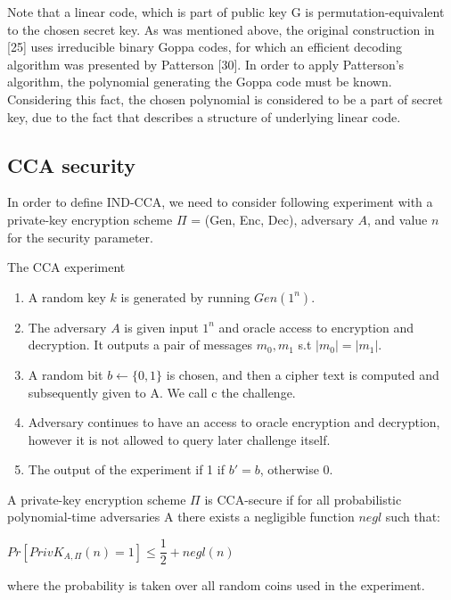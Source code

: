 \noindent Note that a linear code, which is part of public key G is permutation-equivalent to the chosen secret key. As was mentioned above, the original construction in [25] uses irreducible binary Goppa codes, for which an efficient decoding algorithm was presented
by Patterson [30]. In order to apply Patterson's algorithm, the polynomial generating
the Goppa code must be known. Considering this fact, the chosen polynomial is considered to be a part of secret key, due to the fact that describes a structure of underlying linear code.

\subsection{CCA security}
In order to define IND-CCA, we need to consider following experiment with a private-key encryption scheme
$\Pi$ = (Gen, Enc, Dec), adversary $A$, and value $n$ for the security parameter.

\begin{algorithm}[H]
	\caption{The CCA experiment}
	\label{mecs_keygen}
	\begin{enumerate}
		\item A random key $k$ is generated by running  $Gen(1^n)$.
		\item The adversary $A$ is given input $1^n$ and oracle access to encryption and decryption. It outputs a pair of messages $m_{0},m_{1}$ s.t $|m_{0}| = |m_{1}|$.
		\item A random bit $b \gets \{0,1\}$ is chosen, and then a cipher text is computed and subsequently given to A. We call c the challenge.
		\item Adversary continues to have an access to oracle encryption and decryption, however it is not allowed to query later challenge itself.  
		\item The output of the experiment if 1 if $b' = b$, otherwise 0. 
	\end{enumerate}
\end{algorithm}

\noindent A private-key encryption scheme $\Pi$ is CCA-secure if for all
probabilistic polynomial-time adversaries A there exists a negligible function $negl$ such that:
\newline
\newline
\centerline{$Pr[PrivK_{A,\Pi}(n) = 1] \le \dfrac{1}{2} + negl(n)$ }
\newline
\newline
\noindent where the probability is taken over all random coins used in the experiment. 

